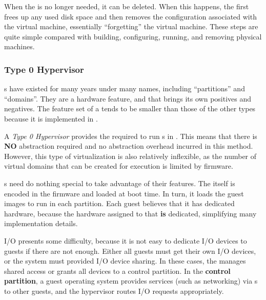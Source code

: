 When the  is no longer needed, it can be deleted.
When this happens, the  first frees up any used disk space and then removes the configuration associated with the virtual machine, essentially ``forgetting'' the virtual machine.
These steps are quite simple compared with building, configuring, running, and removing physical machines.

\subsubsection{Type 0 Hypervisor}\label{subsubsec:Type0_Hypervisor}
s have existed for many years under many names, including ``partitions'' and ``domains''.
They are a hardware feature, and that brings its own positives and negatives.
The feature set of a  tends to be smaller than those of the other types because it is implemented in .

\begin{definition}\label{def:Type0_Hypervisor}
  A \emph{Type 0 Hypervisor} provides the  required to run s in .
  This means that there is \textbf{NO} abstraction required and no abstraction overhead incurred in this method.
  However, this type of virtualization is also relatively inflexible, as the number of virtual domains that can be created for execution is limited by firmware.
\end{definition}

s need do nothing special to take advantage of their features.
The  itself is encoded in the firmware and loaded at boot time.
In turn, it loads the guest images to run in each partition.
Each guest believes that it has dedicated hardware, because the hardware assigned to that  \textbf{is} dedicated, simplifying many implementation details.

I/O presents some difficulty, because it is not easy to dedicate I/O devices to guests if there are not enough.
Either all guests must get their own I/O devices, or the system must provided I/O device sharing.
In these cases, the  manages shared access or grants all devices to a control partition.
In the \textbf{control partition}, a guest operating system provides services (such as networking) via s to other guests, and the hypervisor routes I/O requests appropriately.


